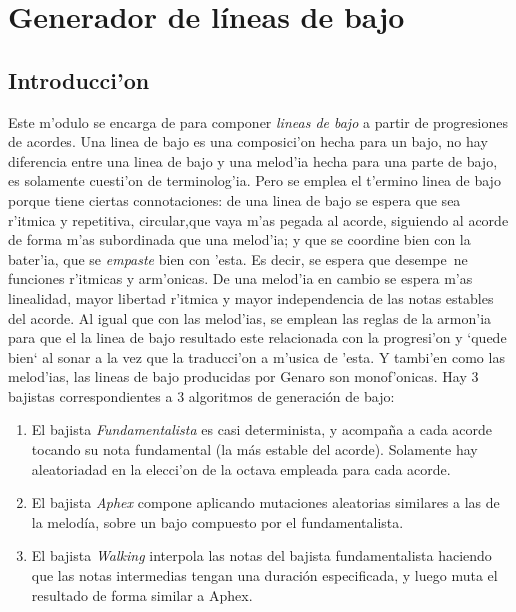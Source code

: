 ﻿\chapter{Generador de l\'ineas de bajo}
\section{Introducci'on}
Este m'odulo se encarga de para componer \emph{lineas de bajo} a partir de progresiones de acordes. Una linea de bajo es una composici'on hecha para un bajo, no hay diferencia entre una linea de bajo y una melod'ia hecha para una parte de bajo, es solamente cuesti'on de terminolog'ia. Pero se emplea el t'ermino linea de bajo porque tiene ciertas connotaciones: de una linea de bajo se espera que sea r'itmica y repetitiva, circular,que vaya m'as pegada al acorde, siguiendo al acorde de forma m'as subordinada que una melod'ia; y que se coordine bien con la bater'ia, que se \emph{empaste} bien con 'esta. Es decir, se espera que desempe~ne funciones r'itmicas y arm'onicas. De una melod'ia en cambio se espera m'as linealidad, mayor libertad r'itmica y mayor independencia de las notas estables del acorde.\newline
Al igual que con las melod'ias, se emplean las reglas de la armon'ia para que el la linea de bajo resultado este relacionada con la progresi'on y `quede bien` al sonar a la vez que la traducci'on a m'usica de 'esta. Y tambi'en como las melod'ias, las lineas de bajo producidas por Genaro son monof'onicas.\newline
Hay 3 bajistas correspondientes a 3 algoritmos de generación de bajo: 
        \begin{enumerate}
        \item El bajista \emph{Fundamentalista} es casi determinista, y acompaña a cada acorde tocando su nota fundamental (la más estable del acorde). Solamente hay aleatoriadad en la elecci'on de la octava empleada para cada acorde.
        \item El bajista \emph{Aphex} compone aplicando mutaciones aleatorias similares a las de la melodía, sobre un bajo compuesto por el fundamentalista.
        \item El bajista \emph{Walking} interpola las notas del bajista fundamentalista haciendo que las notas intermedias tengan una duración especificada, y luego muta el resultado de forma similar a Aphex.
        \end{enumerate}

